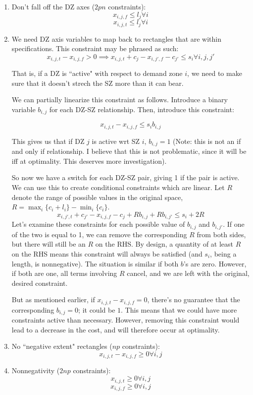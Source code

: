 \documentclass[a4paper]{article}
\begin{document}
\begin{enumerate}
    \item Don't fall off the DZ axes ($2pn$ constraints):
        $$x_{i,j,f} \leq l_j \forall i$$
        $$x_{i,j,t} \leq l_j \forall i$$
    \item We need DZ axis variables to map back to rectangles that are within specifications. This constraint may be phrased as such:
        $$
        x_{i,j,t} - x_{i,j,f} > 0 \implies x_{i,j,t} + c_{j} - x_{i,j',f} - c_{j'} \leq s_i \forall i,j,j'
        $$

        That is, if a DZ is ``active"  with respect to demand zone $i$, we need to make sure that it doesn't strech the SZ more than it can bear. 

        We can partially linearize this constraint as follows. Introduce a binary variable $b_{i,j}$ for each DZ-SZ relationship. Then, introduce this constraint:
        
        $$
        x_{i,j,t} - x_{i,j,f} \leq s_i b_{i,j}
        $$

        This gives us that if DZ $j$ is active wrt SZ $i$, $b_{i,j} = 1$ (Note: this is not an if and only if relationship. I believe that this is not problematic, since it will be iff at optimality. This deserves more investigation). 

        So now we have a switch for each DZ-SZ pair, giving 1 if the pair is active. We can use this to create conditional constraints which are linear. Let $R$ denote the range of possible values in the original space, $R = \max_{i}\{c_i + l_i\} - \min_{i}\{c_i\}$.
        $$
        x_{i,j',t} + c_{j'} - x_{i,j,f} - c_j + Rb_{i,j} + Rb_{i,j'} \leq s_i + 2R
        $$
        Let's examine these constraints for each possible value of $b_{i,j}$ and $b_{i,j'}$. If one of the two is equal to 1, we can remove the corresponding $R$ from both sides, but there will still be an $R$ on the RHS. By design, a quantity of at least $R$ on the RHS means this constraint will always be satisfied (and $s_i$, being a length, is nonnegative). The situation is similar if both $b$'s are zero. However, if both are one, all terms involving $R$ cancel, and we are left with the original, desired constraint. 

        But as mentioned earlier, if $x_{i,j,t} - x_{i,j,f} = 0$, there's no guarantee that the corresponding $b_{i,j} = 0$; it could be $1$. This means that we could have more constraints active than necessary. However, removing this constraint would lead to a decrease in the cost, and will therefore occur at optimality.


    \item No ``negative extent" rectangles ($np$ constraints):
        $$x_{i,j,t} - x_{i,j,f} \geq 0 \forall i,j$$
    \item Nonnegativity ($2np$ constraints):
        $$x_{i,j,t} \geq 0 \forall i,j$$
        $$x_{i,j,f} \geq 0 \forall i,j$$
\end{enumerate}
\end{document}

